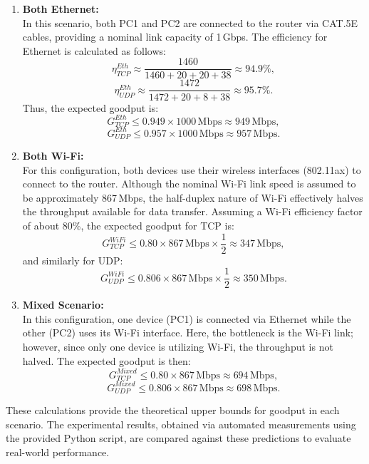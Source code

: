         \begin{enumerate}

            \item \textbf{Both Ethernet:} \\
            In this scenario, both PC1 and PC2 are connected to the router via CAT.5E cables, providing a nominal link capacity of 1\,Gbps. 
            The efficiency for Ethernet is calculated as follows:
            \[
            \eta_{TCP}^{Eth} \approx \frac{1460}{1460 + 20 + 20 + 38} \approx 94.9\%,
            \]
            \[
            \eta_{UDP}^{Eth} \approx \frac{1472}{1472 + 20 + 8 + 38} \approx 95.7\%.
            \]
            Thus, the expected goodput is:
            \[
            G_{TCP}^{Eth} \leq 0.949 \times 1000\,\text{Mbps} \approx 949\,\text{Mbps},
            \]
            \[
            G_{UDP}^{Eth} \leq 0.957 \times 1000\,\text{Mbps} \approx 957\,\text{Mbps}.
            \]

            \vspace{0.2cm} %

            \item \textbf{Both Wi-Fi:} \\
            For this configuration, both devices use their wireless interfaces (802.11ax) to connect to the router. 
            Although the nominal Wi-Fi link speed is assumed to be approximately 867\,Mbps, the half-duplex nature of Wi-Fi effectively halves the throughput available for data transfer. 
            Assuming a Wi-Fi efficiency factor of about 80\%, the expected goodput for TCP is:
            \[
            G_{TCP}^{WiFi} \leq 0.80 \times 867\,\text{Mbps} \times \frac{1}{2} \approx 347\,\text{Mbps},
            \]
            and similarly for UDP:
            \[
            G_{UDP}^{WiFi} \leq 0.806 \times 867\,\text{Mbps} \times \frac{1}{2} \approx 350\,\text{Mbps}.
            \]


            \item \textbf{Mixed Scenario:} \\
            In this configuration, one device (PC1) is connected via Ethernet while the other (PC2) uses its Wi-Fi interface. 
            Here, the bottleneck is the Wi-Fi link; however, since only one device is utilizing Wi-Fi, the throughput is not halved. 
            The expected goodput is then:
            \[
            G_{TCP}^{Mixed} \leq 0.80 \times 867\,\text{Mbps} \approx 694\,\text{Mbps},
            \]
            \[
            G_{UDP}^{Mixed} \leq 0.806 \times 867\,\text{Mbps} \approx 698\,\text{Mbps}.
            \]

        \end{enumerate}

        These calculations provide the theoretical upper bounds for goodput in each scenario. 
        The experimental results, obtained via automated measurements using the provided Python script, are compared against these predictions to evaluate real-world performance.

        \medskip